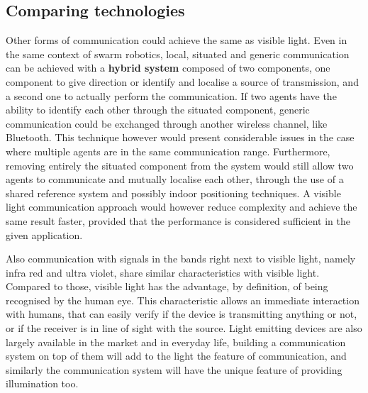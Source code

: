 \subsection{Comparing technologies}
Other forms of communication could achieve the same as visible light.
Even in the same context of swarm robotics, local, situated and generic communication can be achieved with a \textbf{hybrid system} composed of two components, one component to give direction or identify and localise a source of transmission, and a second one to actually perform the communication.
%
If two agents have the ability to identify each other through the situated component, generic communication could be exchanged through another wireless channel, like Bluetooth.
This technique however would present considerable issues in the case where multiple agents are in the same communication range.
Furthermore, removing entirely the situated component from the system would still allow two agents to communicate and mutually localise each other, through the use of a shared reference system and possibly indoor positioning techniques.
A visible light communication approach would however reduce complexity and achieve the same result faster, provided that the performance is considered sufficient in the given application.

Also communication with signals in the bands right next to visible light, namely infra red and ultra violet, share similar characteristics with visible light.
Compared to those, visible light has the advantage, by definition, of being recognised by the human eye.
This characteristic allows an immediate interaction with humans, that can easily verify if the device is transmitting anything or not, or if the receiver is in line of sight with the source.
Light emitting devices are also largely available in the market and in everyday life, building a communication system on top of them will add to the light the feature of communication, and similarly the communication system will have the unique feature of providing illumination too.

